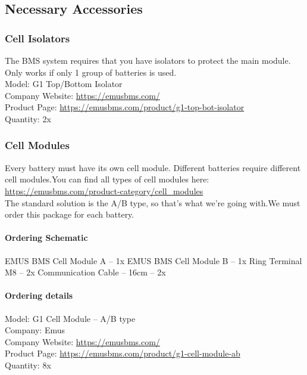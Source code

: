 \subsection{Necessary Accessories}

\subsubsection{Cell Isolators}

The BMS system requires that you have isolators to protect the main module. Only works if only 1 group of batteries is used.
 \\
Model: G1 Top/Bottom Isolator\\
Company Website: \href{https://emusbms.com/}{https://emusbms.com/} \\
Product Page: \href{https://emusbms.com/product/g1-top-bot-isolator}{https://emusbms.com/product/g1-top-bot-isolator} \\
Quantity: 2x \\

\subsubsection{Cell Modules}

Every battery must have its own cell module. Different batteries require different cell modules.You can find all types of cell modules here:
 \\
\href{https://emusbms.com/product-category/cell_modules}{https://emusbms.com/product-category/cell\_modules}
 \\
The standard solution is the A/B type, so that’s what we’re going with.We must order this package for each battery.

\paragraph{Ordering Schematic}
EMUS BMS Cell Module A – 1x
EMUS BMS Cell Module B – 1x
Ring Terminal M8 – 2x
Communication Cable – 16cm – 2x
\par
\paragraph{Ordering details}

Model: G1 Cell Module – A/B type\\
Company: Emus\\
Company Website: \href{https://emusbms.com}{https://emusbms.com/} \\
Product Page: \href{https://emusbms.com/product/g1-cell-module-ab}{https://emusbms.com/product/g1-cell-module-ab} \\
Quantity: 8x \\

